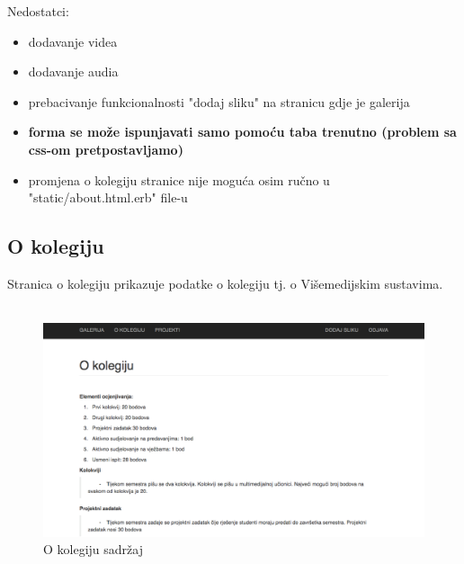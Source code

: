 \documentclass[]{article}
\begin{document}
\newpage

Nedostatci:
\begin{itemize}
	\item dodavanje videa
	\item dodavanje audia
	\item prebacivanje funkcionalnosti "dodaj sliku" na stranicu gdje je galerija
	\item \textbf{forma se može ispunjavati samo pomoću taba trenutno (problem sa css-om pretpostavljamo)}
	\item promjena o kolegiju stranice nije moguća osim ručno u "static/about.html.erb" file-u
\end{itemize}
\newpage
\subsection{O kolegiju}
Stranica o kolegiju prikazuje podatke o kolegiju tj. o Višemedijskim sustavima.
\\
\\
\begin{figure}[h]
	\centering
	\includegraphics[scale=0.22]{o-kolegiju}
	\caption{O kolegiju sadržaj}
	\label{fig:mesh1}
\end{figure}
\end{document}
